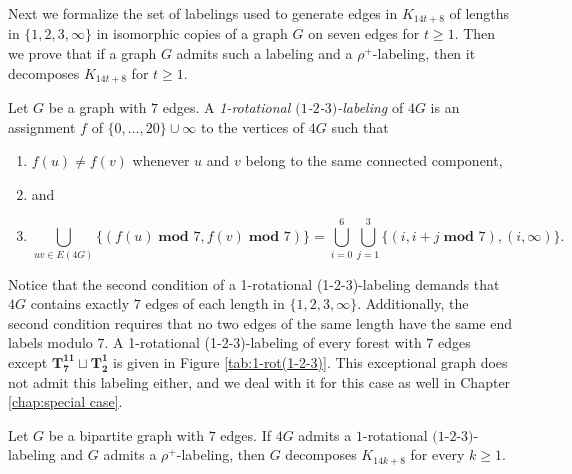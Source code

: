 Next we formalize the set of labelings used to generate edges in $K_{14t+8}$ of lengths in $\{1,2,3,\infty\}$ in isomorphic copies of a graph $G$ on seven edges for $t\geq 1$. Then we prove that if a graph $G$ admits such a labeling and a $\rho^{+}$-labeling, then it decomposes $K_{14t+8}$ for $t\geq 1$.

\begin{definition}\label{def:1-2-3-1-rot}
    Let $G$ be a graph with $7$ edges. A \emph{1-rotational $(1$-$2$-$3)$-labeling} of $4G$ is an assignment $f$ of $\{0,\dots,20\} \cup \infty$ to the vertices of $4G$ such that
    \begin{enumerate}
        \item $f(u) \neq f(v)$ whenever $u$ and $v$ belong to the same connected component, 
        \item[] and
        \item  $$ \bigcup_{uv\in E(4G)} \{(f(u)\; \textbf{mod } 7,f(v)\; \textbf{mod } 7)\}= \bigcup_{i=0}^{6} \bigcup_{j=1}^{3} \{(i,i+j \; \textbf{mod } 7), (i,\infty)\}.$$
    \end{enumerate}
\end{definition}
Notice that the second condition of a 1-rotational (1-2-3)-labeling demands that $4G$ contains exactly $7$ edges of each length in $\{1,2,3,\infty\}$. Additionally, the second condition requires that no two edges of the same length have the same end labels modulo $7$. A 1-rotational (1-2-3)-labeling of every forest with $7$ edges except $\mathbf{T_{7}^{11}}\sqcup\mathbf{T_{2}^{1}}$ is given in Figure \ref{tab:1-rot(1-2-3)}. This exceptional graph does not admit this labeling either, and we deal with it for this case as well in Chapter \ref{chap:special case}.

\begin{thm}\label{thm:1-2-3 1-rot plus rho}
    Let $G$ be a bipartite graph with $7$ edges. If $4G$ admits a $1$-rotational  $(1$-$2$-$3)$-labeling and $G$ admits a $\rho^{+}$-labeling, then $G$ decomposes $K_{14k+8}$ for every $k\geq1.$
\end{thm}

